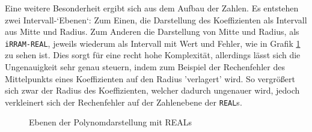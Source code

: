 Eine weitere Besonderheit ergibt sich aus dem Aufbau der Zahlen. Es entstehen zwei Intervall-`Ebenen`: Zum Einen, die Darstellung des Koeffizienten als Intervall aus Mitte und Radius. Zum Anderen die Darstellung von Mitte und Radius, als \verb+iRRAM-REAL+, jeweils wiederum als Intervall mit Wert und Fehler, wie in Grafik \ref{fig:levels} zu sehen ist. Dies sorgt für eine recht hohe Komplexität, allerdings lässt sich die Ungenauigkeit sehr genau steuern, indem zum Beispiel der Rechenfehler des Mittelpunkts eines Koeffizienten auf den Radius 'verlagert' wird. So vergrößert sich zwar der Radius des Koeffizienten, welcher dadurch ungenauer wird, jedoch verkleinert sich der Rechenfehler auf der Zahlenebene der \verb+REAL+s. 





\begin{figure}[tbh]
\begin{center}
 
   
 \caption{Ebenen der Polynomdarstellung mit REALs}
 \label{fig:levels}
 \end{center}
\end{figure}


